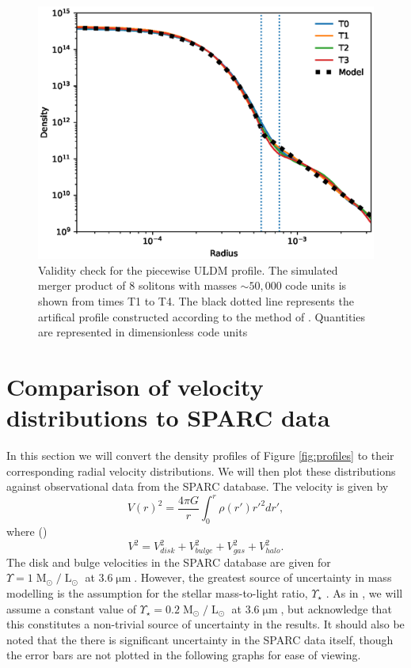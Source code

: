 \documentclass[a4paper,11pt]{article}
\begin{document}
\begin{figure}
\centering
\includegraphics[scale = 0.7, trim={0cm 0cm 1cm 0.35cm}]{pics/combined.eps} 
\caption{Validity check for the piecewise ULDM profile. The simulated merger product of 8 solitons with masses $\sim 50,000$ code units is shown from times T1 to T4. The black dotted line represents the artifical profile constructed according to the method of \cite{Robles:2018fur}. Quantities are represented in dimensionless code units}\label{fig:validity}
\end{figure}

\section{Comparison of velocity distributions to SPARC data}

In this section we will convert the density profiles of Figure \ref{fig:profiles} to their corresponding radial velocity distributions. We will then plot these distributions against observational data from the SPARC database. The velocity is given by
\begin{equation}
    V(r)^2 = \frac{4\pi G}{r}\int_0^r \rho(r')r'^2 dr',
\end{equation}
where (\cite{Sofue:2008wt})
\begin{equation}
    V^2 = V_{disk}^2 + V_{bulge}^2 + V_{gas}^2 + V_{halo}^2.
\end{equation}
The disk and bulge velocities in the SPARC database are given for $\Upsilon = 1 \operatorname{M}_{\odot}/\operatorname{L}_{\odot}$ at $3.6\operatorname{\mu m}$. However, the greatest source of uncertainty in mass modelling is the assumption for the stellar mass-to-light ratio, $\Upsilon_\star$ \cite{Lelli:2016zqa}. As in \cite{Robles:2018fur}, we will assume a constant value of $\Upsilon_\star = 0.2 \operatorname{M}_{\odot}/\operatorname{L}_{\odot}$ at $3.6\operatorname{\mu m}$, but acknowledge that this constitutes a non-trivial source of uncertainty in the results. It should also be noted that the there is significant uncertainty in the SPARC data itself, though the error bars are not plotted in the following graphs for ease of viewing. 
\end{document}
